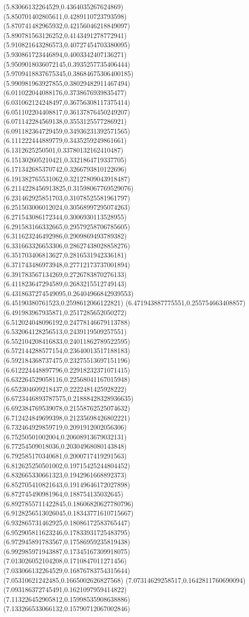 {(5.83066132264529,0.4364035267624869)
(5.850701402805611,0.4289110723793598)
(5.870741482965932,0.42156046218849097)
(5.890781563126252,0.4143491278772941)
(5.910821643286573,0.40727454703380095)
(5.930861723446894,0.4003342407136271)
(5.9509018036072145,0.3935257735406444)
(5.9709418837675345,0.38684675306400185)
(5.990981963927855,0.38029482911467494)
(6.011022044088176,0.3738676939835477)
(6.031062124248497,0.36756308117375414)
(6.051102204408817,0.36137876450249207)
(6.071142284569138,0.3553125577286921)
(6.091182364729459,0.34936231392571565)
(6.111222444889779,0.3435259249861661)
(6.1312625250501,0.33780132162410487)
(6.151302605210421,0.3321864719337705)
(6.171342685370742,0.3266793810122696)
(6.191382765531062,0.32127809043918487)
(6.2114228456913825,0.31598067769529076)
(6.231462925851703,0.31078525581961797)
(6.251503006012024,0.30568997295074263)
(6.271543086172344,0.3006930113528955)
(6.291583166332665,0.29579258706785605)
(6.311623246492986,0.2909869493789382)
(6.331663326653306,0.28627438028858276)
(6.351703406813627,0.2816531942336181)
(6.371743486973948,0.27712173737001894)
(6.391783567134269,0.2726783870276133)
(6.411823647294589,0.2683215512749143)
(6.4318637274549095,0.26404966842939553)
(6.45190380761523,0.2598612066122821)
(6.471943887775551,0.255754663408857)
(6.491983967935871,0.2517285652050272)
(6.512024048096192,0.24778146679113788)
(6.532064128256513,0.2439119509257551)
(6.552104208416833,0.24011862789522595)
(6.572144288577154,0.23640013517188183)
(6.592184368737475,0.23275513697151196)
(6.612224448897796,0.22918232371071415)
(6.632264529058116,0.22568041167015948)
(6.652304609218437,0.2222481425928222)
(6.6723446893787575,0.21888428328936635)
(6.692384769539078,0.21558762525074632)
(6.712424849699398,0.21235698426802221)
(6.732464929859719,0.2091912002056306)
(6.75250501002004,0.20608913679032131)
(6.77254509018036,0.20304968080143848)
(6.792585170340681,0.2000717419291563)
(6.812625250501002,0.19715425244804452)
(6.832665330661323,0.1942961668892373)
(6.852705410821643,0.19149646172027898)
(6.872745490981964,0.188754135032645)
(6.8927855711422845,0.18606820627780796)
(6.9128256513026045,0.18343771610715667)
(6.932865731462925,0.18086172583765447)
(6.952905811623246,0.17833931725483795)
(6.972945891783567,0.17586959235819438)
(6.992985971943887,0.17345167309918075)
(7.013026052104208,0.1710847011271456)
(7.033066132264529,0.16876783754315644)
(7.05310621242485,0.1665002626827568)
(7.07314629258517,0.1642811760690094)
(7.093186372745491,0.1621097959414822)
(7.113226452905812,0.15998535908638886)
(7.133266533066132,0.15790712067002846)
}
